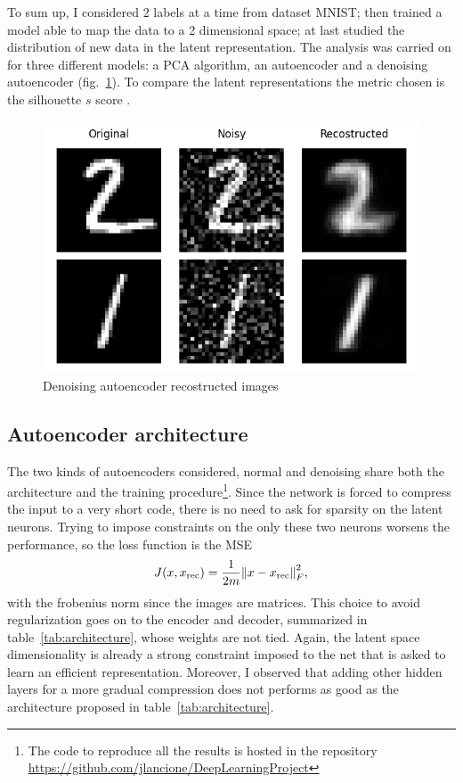 \documentclass[twocolumn,gsifonts,twoside]{gsipaper}
\begin{document}
To sum up, I considered 2 labels at a time from dataset MNIST; then trained a model able to map the data to a 2 dimensional space; at last studied the distribution of new data in the latent representation. The analysis was carried on for three different models: a PCA algorithm, an autoencoder and a denoising autoencoder (fig.~\ref{fig:denoising_ae}). To compare the latent representations the metric chosen is the silhouette $s$ score \cite{Rousseeuw1987}. 
\begin{figure}
  \centering
  \includegraphics[width=.75\linewidth]{denoising_ae.png}
  \caption{Denoising autoencoder recostructed images}
  \label{fig:denoising_ae}
\end{figure}

\subsection{Autoencoder architecture}
The two kinds of autoencoders considered, normal and denoising share both the architecture and the training procedure\footnote{The code to reproduce all the results is hosted in the repository \url{https://github.com/jlancione/DeepLearningProject}}. Since the network is forced to compress the input to a very short code, there is no need to ask for sparsity on the latent neurons. Trying to impose constraints on the only these two neurons worsens the performance, so the loss function is the MSE
\[
J(x,x_\textup{rec}) = \frac{1}{2m}\norm{x - x_\textup{rec}}^2_F,
\]
with the frobenius norm since the images are matrices. This choice to avoid regularization goes on to the encoder and decoder, summarized in table~\ref{tab:architecture}, whose weights are not tied. Again, the latent space dimensionality is already a strong constraint imposed to the net that is asked to learn an efficient representation. Moreover, I observed that adding other hidden layers for a more gradual compression does not performs as good as the architecture proposed in table~\ref{tab:architecture}.
\end{document}
